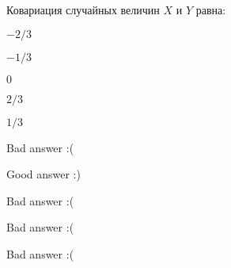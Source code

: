 
\begin{question}
Ковариация случайных величин \(X\) и \(Y\) равна:
\begin{answerlist}
  \item \(-2/3\)
  \item \(-1/3\)
  \item \(0\)
  \item \(2/3\)
  \item \(1/3\)
\end{answerlist}
\end{question}

\begin{solution}
\begin{answerlist}
  \item Bad answer :(
  \item Good answer :)
  \item Bad answer :(
  \item Bad answer :(
  \item Bad answer :(
\end{answerlist}
\end{solution}

